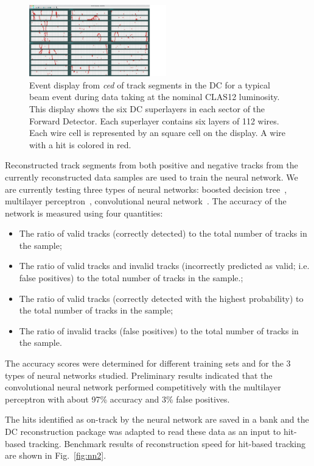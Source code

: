 \begin{figure}
\centering
\includegraphics[width=0.53\textwidth]{pics/nn1.png}
\caption{Event display from {\it ced} of track segments in the DC for a typical beam event during data taking
  at the nominal CLAS12 luminosity. This display shows the six DC superlayers in each sector of the Forward
  Detector. Each superlayer contains six layers of 112 wires. Each wire cell is represented by an square cell on the
  display. A wire with a hit is colored in red.}
\label{fig:nn1}
\end{figure}

Reconstructed track segments from both positive and negative tracks from the currently reconstructed data
samples are used to train the neural network. We are currently testing three types of neural networks: boosted
decision tree~\cite{bdt}, multilayer perceptron~\cite{mp}, convolutional neural network~\cite{cnn}. The accuracy
of the network is measured using four quantities:

\begin{itemize}
\item The ratio of valid tracks (correctly detected) to the total number of tracks in the sample;
\item The ratio of valid tracks and invalid tracks (incorrectly predicted as valid; i.e. false positives) to the
  total number of tracks in the sample.;
\item The ratio of valid tracks (correctly detected with the highest probability) to the total number of tracks in
  the sample;
\item The ratio of invalid tracks (false positives) to the total number of tracks in the sample.
\end{itemize}

The accuracy scores were determined for different training sets and for the 3 types of neural networks studied.
Preliminary results indicated that the convolutional neural network performed competitively with the multilayer
perceptron with about 97\% accuracy and 3\% false positives. 

The hits identified as on-track by the neural network are saved in a bank and the DC reconstruction package was
adapted to read these data as an input to hit-based tracking. Benchmark results of reconstruction speed for
hit-based tracking are shown in Fig.~\ref{fig:nn2}.

